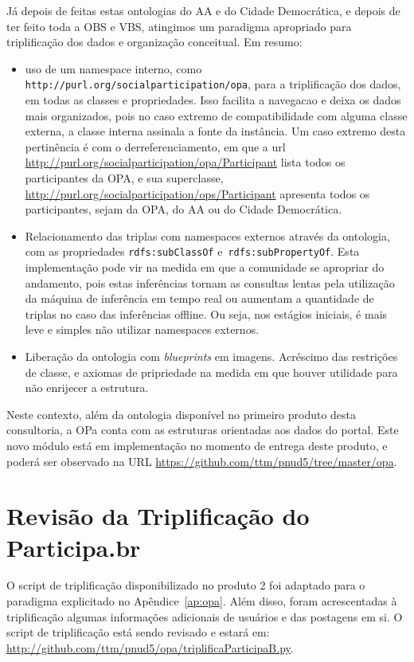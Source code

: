 \documentclass[12pt]{article}
\begin{document}
Já depois de feitas estas ontologias do AA e do Cidade Democrática, e depois de ter feito toda a OBS e VBS, atingimos um paradigma apropriado para triplificação dos dados e organização conceitual. Em resumo:
\begin{itemize}
    \item uso de um namespace interno, como \texttt{http://purl.org/socialparticipation/opa}, para a triplificação dos dados, em todas as classes e propriedades. Isso facilita a navegacao e deixa os dados mais organizados, pois no caso extremo de compatibilidade com alguma classe externa, a classe interna assinala a fonte da instância. Um caso extremo desta pertinência é com o derreferenciamento, em que a url \url{http://purl.org/socialparticipation/opa/Participant} lista todos os participantes da OPA, e sua superclasse, \url{http://purl.org/socialparticipation/ops/Participant} apresenta todos os participantes, sejam da OPA, do AA ou do Cidade Democrática.
    \item Relacionamento das triplas com namespaces externos através da ontologia, com as propriedades \texttt{rdfs:subClassOf} e~\texttt{rdfs:subPropertyOf}. Esta implementação pode vir na medida em que a comunidade se apropriar do andamento, pois estas inferências tornam as consultas lentas pela utilização da máquina de inferência em tempo real ou aumentam a quantidade de triplas no caso das inferências offline. Ou seja, nos estágios iniciais, é mais leve e simples não utilizar namespaces externos.
    \item Liberação da ontologia com \emph{blueprints} em imagens. Acréscimo das restrições de classe, e axiomas de pripriedade na medida em que houver utilidade para não enrijecer a estrutura.
\end{itemize}

Neste contexto, além da ontologia disponível no primeiro produto desta consultoria, a OPa conta com as estruturas orientadas aos dados do portal. Este novo módulo está em implementação no momento de entrega deste produto, e poderá ser observado na URL \url{https://github.com/ttm/pnud5/tree/master/opa}.

\section{Revisão da Triplificação do Participa.br}
O script de triplificação disponibilizado no produto 2 foi adaptado para o paradigma explicitado no Apêndice~\ref{ap:opa}. Além disso,
foram acrescentadas à triplificação algumas informações adicionais de usuários e das postagens em si. O script de triplificação está sendo revisado e estará em: \url{http://github.com/ttm/pnud5/opa/triplificaParticipaB.py}.
\newpage
\end{document}
